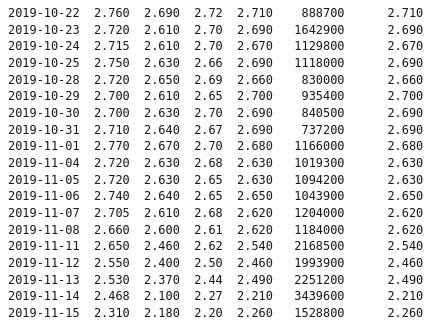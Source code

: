 \documentclass[11pt]{article}
\begin{document}
\begin{Verbatim}[commandchars=\\\{\}]
2019-10-22  2.760  2.690  2.72  2.710    888700      2.710
2019-10-23  2.720  2.610  2.70  2.690   1642900      2.690
2019-10-24  2.715  2.610  2.70  2.670   1129800      2.670
2019-10-25  2.750  2.630  2.66  2.690   1118000      2.690
2019-10-28  2.720  2.650  2.69  2.660    830000      2.660
2019-10-29  2.700  2.610  2.65  2.700    935400      2.700
2019-10-30  2.700  2.630  2.70  2.690    840500      2.690
2019-10-31  2.710  2.640  2.67  2.690    737200      2.690
2019-11-01  2.770  2.670  2.70  2.680   1166000      2.680
2019-11-04  2.720  2.630  2.68  2.630   1019300      2.630
2019-11-05  2.720  2.630  2.65  2.630   1094200      2.630
2019-11-06  2.740  2.640  2.65  2.650   1043900      2.650
2019-11-07  2.705  2.610  2.68  2.620   1204000      2.620
2019-11-08  2.660  2.600  2.61  2.620   1184000      2.620
2019-11-11  2.650  2.460  2.62  2.540   2168500      2.540
2019-11-12  2.550  2.400  2.50  2.460   1993900      2.460
2019-11-13  2.530  2.370  2.44  2.490   2251200      2.490
2019-11-14  2.468  2.100  2.27  2.210   3439600      2.210
2019-11-15  2.310  2.180  2.20  2.260   1528800      2.260


\end{Verbatim}
\end{document}
